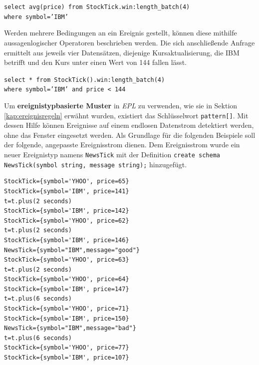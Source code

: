 \documentclass{acm_proc_article-sp}
\begin{document}
\texttt{select  avg(price) from StockTick.win:length\_batch(4)\\where symbol='IBM'}
\begin{table}[ht]
    \caption{\texttt{batch}-Längenfenster}
    \label{table:warteschlange-batch}\vspace{0.2cm}
\end{table}

Werden mehrere Bedingungen an ein Ereignis gestellt, können diese mithilfe 
aussagenlogischer Operatoren beschrieben werden. Die sich anschließende Anfrage ermittelt 
aus jeweils vier Datensätzen, diejenige Kursaktualisierung, die IBM betrifft und den Kurs 
unter einen Wert von 144 fallen lässt.

\texttt{select * from StockTick().win:length\_batch(4)\\where symbol='IBM' and 
price < 144}

Um \textbf{ereignistypbasierte Muster} in \textit{EPL} zu verwenden, wie sie in Sektion 
\ref{kap:ereignisregeln} erwähnt wurden, existiert das Schlüsselwort \texttt{pattern[]}. 
Mit dessen Hilfe können Ereignisse auf einem endlosen Datenstrom detektiert werden, ohne 
das Fenster eingesetzt werden. Als Grundlage für die folgenden Beispiele soll der 
folgende, angepasste Ereignisstrom dienen. Dem Ereignisstrom wurde ein neuer Ereignistyp 
namens 
\texttt{NewsTick} mit der Definition
\texttt{create schema NewsTick(symbol string, message string);} hinzugefügt.
\begin{verbatim}
StockTick={symbol='YHOO', price=65}
StockTick={symbol='IBM', price=141}
t=t.plus(2 seconds)
StockTick={symbol='IBM', price=142}
StockTick={symbol='YHOO', price=62}
t=t.plus(2 seconds)
StockTick={symbol='IBM', price=146}
NewsTick={symbol="IBM",message="good"}
StockTick={symbol='YHOO', price=63}
t=t.plus(2 seconds)
StockTick={symbol='YHOO', price=64}
StockTick={symbol='IBM', price=147}
t=t.plus(6 seconds)
StockTick={symbol='YHOO', price=71}
StockTick={symbol='IBM', price=150}
NewsTick={symbol="IBM",message="bad"}
t=t.plus(6 seconds)
StockTick={symbol='YHOO', price=77}
StockTick={symbol='IBM', price=107}
\end{verbatim}
\end{document}
